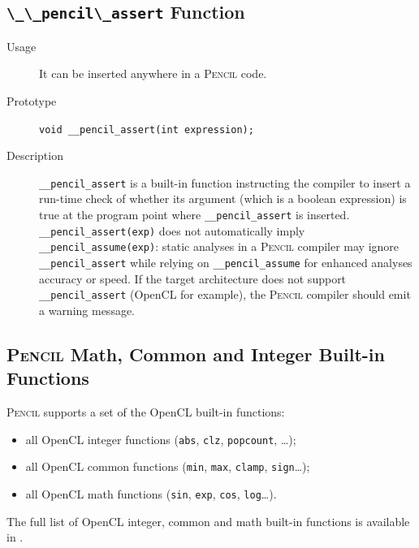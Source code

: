 \documentclass{carp}
\newcommand\pencil{\textsc{Pencil}\xspace}
\begin{document}
\subsection{\lstinline!\_\_pencil\_assert! Function}
\begin{description}
\item [Usage] It can be inserted anywhere in a \pencil code.
\item [Prototype] \lstinline!void __pencil_assert(int expression);!
\item [Description] \lstinline!__pencil_assert! is a built-in function
  instructing the compiler to insert a run-time check of whether its argument
  (which is a boolean expression) is true at the program point where
  \lstinline!__pencil_assert! is inserted.
  \lstinline!__pencil_assert(exp)! does not automatically imply
  \lstinline!__pencil_assume(exp)!: static analyses in a \pencil compiler may
  ignore \lstinline!__pencil_assert! while relying on
  \lstinline!__pencil_assume! for enhanced analyses accuracy or speed.  If the
  target architecture does not support \lstinline!__pencil_assert! (OpenCL for
  example), the \pencil compiler should emit a warning message.
\end{description}

\subsection{\pencil Math, Common and Integer Built-in Functions}

\pencil supports a set of the OpenCL built-in functions:
\begin{itemize}
  \item all OpenCL integer functions (\lstinline!abs!, \lstinline!clz!,
        \lstinline!popcount!,  \dots);
  \item all OpenCL common functions (\lstinline!min!, \lstinline!max!,
        \lstinline!clamp!, \lstinline!sign!\dots);
  \item all OpenCL math functions (\lstinline!sin!, \lstinline!exp!,
        \lstinline!cos!, \lstinline!log!\dots).
\end{itemize}

The full list of OpenCL integer, common and math built-in functions is
available in \cite{opencl-1.2}.
\end{document}
